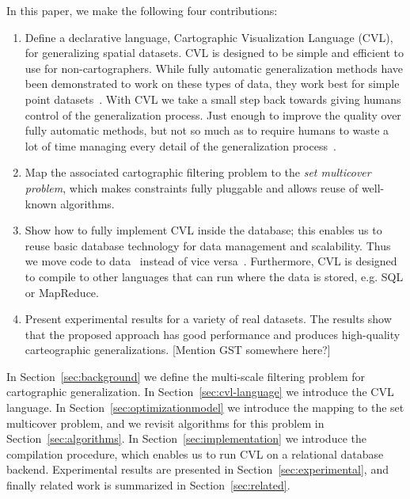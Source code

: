 In this paper, we make the following four contributions:
\begin{enumerate}
\item Define a declarative language, Cartographic Visualization Language (CVL), for generalizing spatial datasets. CVL is designed to be simple and efficient to use for non-cartographers. While fully automatic generalization methods have been demonstrated to work on these types of data, they work best for simple point datasets~\cite{thinningpaper}. With CVL we take a small step back towards giving humans control of the generalization process. Just enough to improve the quality over fully automatic methods, but not so much as to require humans to waste a lot of time managing every detail of the generalization process~\cite{fme}. 

\item Map the associated cartographic filtering problem to the \emph{set multicover problem}, which makes constraints fully pluggable and allows reuse of well-known algorithms.

\item Show how to fully implement CVL inside the database; this enables us to reuse basic database technology for data management and scalability. Thus we move code to data~\cite{mapreduce} instead of vice versa~\cite{fusiontables}. Furthermore, CVL is designed to compile to other languages that can run where the data is stored, e.g. SQL or MapReduce.

\item Present experimental results for a variety of real datasets. The results show that the proposed approach has good performance and produces high-quality carteographic generalizations. [Mention GST somewhere here?] 
\end{enumerate}

In Section~\ref{sec:background} we define the multi-scale filtering problem for cartographic generalization. In Section~\ref{sec:cvl-language} we introduce the CVL language. In Section~\ref{sec:optimizationmodel} we introduce the mapping to the set multicover problem, and we revisit algorithms for this problem in Section~\ref{sec:algorithms}. In Section~\ref{sec:implementation} we introduce the compilation procedure, which enables us to run CVL on a relational database backend. Experimental results are presented in Section~\ref{sec:experimental}, and finally related work is summarized in Section~\ref{sec:related}.
